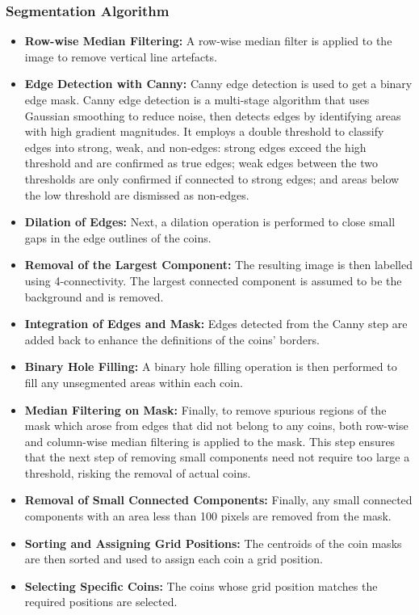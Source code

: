 \documentclass[11pt]{article}
\begin{document}
\subsubsection{Segmentation Algorithm}
\begin{itemize}
\item \textbf{Row-wise Median Filtering:} A row-wise median filter is applied to the image to remove vertical line artefacts.
\item \textbf{Edge Detection with Canny:} Canny edge detection is used to get a binary edge mask. Canny edge detection is a multi-stage algorithm that uses Gaussian smoothing to reduce noise, then detects edges by identifying areas with high gradient magnitudes. It employs a double threshold to classify edges into strong, weak, and non-edges: strong edges exceed the high threshold and are confirmed as true edges; weak edges between the two thresholds are only confirmed if connected to strong edges; and areas below the low threshold are dismissed as non-edges.
\item \textbf{Dilation of Edges:} Next, a dilation operation is performed to close small gaps in the edge outlines of the coins.
\item \textbf{Removal of the Largest Component:} The resulting image is then labelled using 4-connectivity. The largest connected component is assumed to be the background and is removed.
\item \textbf{Integration of Edges and Mask:} Edges detected from the Canny step are added back to enhance the definitions of the coins' borders.
\item \textbf{Binary Hole Filling:} A binary hole filling operation is then performed to fill any unsegmented areas within each coin. 
\item \textbf{Median Filtering on Mask:} Finally, to remove spurious regions of the mask which arose from edges that did not belong to any coins, both row-wise and column-wise median filtering is applied to the mask. This step ensures that the next step of removing small components need not require too large a threshold, risking the removal of actual coins.
\item \textbf{Removal of Small Connected Components:} Finally, any small connected components with an area less than 100 pixels are removed from the mask.
\item \textbf{Sorting and Assigning Grid Positions:} The centroids of the coin masks are then sorted and used to assign each coin a grid position. 
\item \textbf{Selecting Specific Coins:} The coins whose grid position matches the required positions are selected.

\end{itemize}
\end{document}
